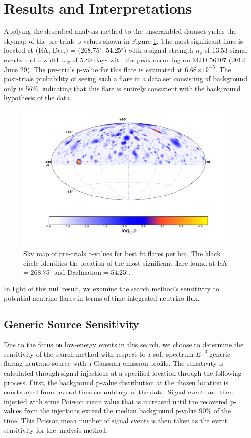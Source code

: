 \documentclass[manuscript]{aastex}
\begin{document}
\section{Results and Interpretations}
Applying the described analysis method to the unscrambled dataset yields the skymap of the pre-trials p-values shown in Figure \ref{fig:RealSkyMap}. The most significant flare is located at (RA, Dec.) = (268.75$^{\circ}$, 54.25$^{\circ}$) with a signal strength $n_s$ of 13.53 signal events and a width $\sigma_w$ of 5.89 days with the peak occurring on MJD 56107 (2012 June 29). The pre-trials p-value for this flare is estimated at 6.68$\times 10^{-5}$. The post-trials probability of seeing such a flare in a data set consisting of background only is 56$\%$, indicating that this flare is entirely consistent with the background hypothesis of the data.
\begin{figure}[ht]
  \begin{center}
    \includegraphics[width=1.0\textwidth,keepaspectratio]{plots/RealResultSkyMap.png}
  \end{center}
  \caption[Results Sky Map]{Sky map of pre-trials p-values for best fit flares per bin. The black circle identifies the location of the most significant flare found at RA = 268.75$^\circ$ and Declination = 54.25$^\circ$.}
  \label{fig:RealSkyMap}
\end{figure}
In light of this null result, we examine the search method's sensitivity to potential neutrino flares in terms of time-integrated neutrino flux.
\subsection{Generic Source Sensitivity}
Due to the focus on low-energy events in this search, we choose to determine the sensitivity of the search method with respect to a soft-spectrum $E^{-3}$ generic flaring neutrino source with a Gaussian emission profile. The sensitivity is calculated through signal injections at a specified location through the following process. First, the background p-value distribution at the chosen location is constructed from several time scramblings of the data. Signal events are then injected with some Poisson mean value that is increased until the recovered p-values from the injections exceed the median background p-value 90$\%$ of the time. This Poisson mean number of signal events is then taken as the event sensitivity for the analysis method.
\end{document}
